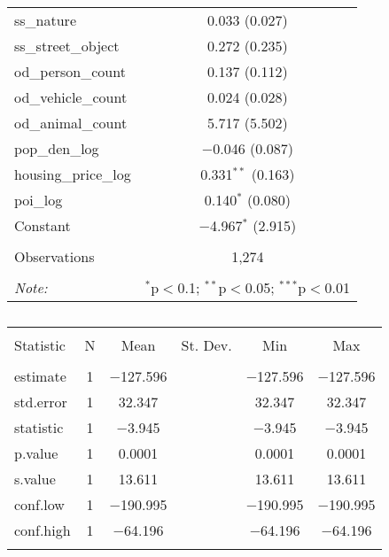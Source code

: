 \begin{table}[!htbp]
\begin{tabular}{@{\extracolsep{1pt}}lc}
  ss\_nature & 0.033 (0.027) \\ 
  ss\_street\_object & 0.272 (0.235) \\ 
  od\_person\_count & 0.137 (0.112) \\ 
  od\_vehicle\_count & 0.024 (0.028) \\ 
  od\_animal\_count & 5.717 (5.502) \\ 
  pop\_den\_log & $-$0.046 (0.087) \\ 
  housing\_price\_log & 0.331$^{**}$ (0.163) \\ 
  poi\_log & 0.140$^{*}$ (0.080) \\ 
  Constant & $-$4.967$^{*}$ (2.915) \\ 
 \hline \\[-1.8ex] 
Observations & 1,274 \\ 
\hline 
\hline \\[-1.8ex] 
\textit{Note:}  & \multicolumn{1}{r}{$^{*}$p$<$0.1; $^{**}$p$<$0.05; $^{***}$p$<$0.01} \\ 
\end{tabular} 
\end{table} 

\begin{table}[!htbp] \centering 
  \caption{} 
  \label{} 
\small 
\begin{tabular}{@{\extracolsep{1pt}}lccccc} 
\\[-1.8ex]\hline 
\hline \\[-1.8ex] 
Statistic & \multicolumn{1}{c}{N} & \multicolumn{1}{c}{Mean} & \multicolumn{1}{c}{St. Dev.} & \multicolumn{1}{c}{Min} & \multicolumn{1}{c}{Max} \\ 
\hline \\[-1.8ex] 
estimate & 1 & $-$127.596 &  & $-$127.596 & $-$127.596 \\ 
std.error & 1 & 32.347 &  & 32.347 & 32.347 \\ 
statistic & 1 & $-$3.945 &  & $-$3.945 & $-$3.945 \\ 
p.value & 1 & 0.0001 &  & 0.0001 & 0.0001 \\ 
s.value & 1 & 13.611 &  & 13.611 & 13.611 \\ 
conf.low & 1 & $-$190.995 &  & $-$190.995 & $-$190.995 \\ 
conf.high & 1 & $-$64.196 &  & $-$64.196 & $-$64.196 \\ 
\hline \\[-1.8ex] 
\end{tabular} 
\end{table} 

